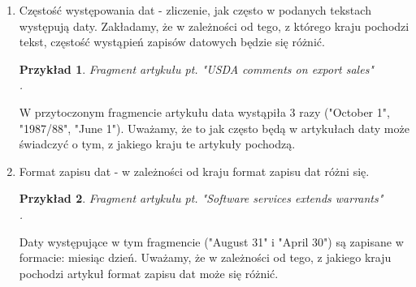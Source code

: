 \documentclass{classrep}
\newtheorem{exmp}{Przykład}[section]
\begin{document}
\begin{enumerate}
    \item Częstość występowania dat - zliczenie, jak często w podanych tekstach występują daty. Zakładamy, że w zależności od tego, z którego kraju pochodzi tekst, częstość wystąpień zapisów datowych będzie się różnić. \\
    \begin{exmp} Fragment artykułu pt. "USDA comments on export sales"  \cite{reuters} \\
		. \\
    \end{exmp}W przytoczonym fragmencie artykułu data wystąpiła 3 razy ("October 1", "1987/88", "June 1"). Uważamy, że to jak często będą w artykułach daty może świadczyć o tym, z jakiego kraju te artykuły pochodzą. \\
    \item Format zapisu dat - w zależności od kraju format zapisu dat różni się. \\
	\begin{exmp} Fragment artykułu pt. "Software services extends warrants" \cite{reuters} \\ 
		.\\
    \end{exmp} Daty występujące w tym fragmencie ("August 31" i "April 30") są zapisane w formacie: miesiąc dzień. Uważamy, że w zależności od tego, z jakiego kraju pochodzi artykuł format zapisu dat może się różnić.
    

\end{enumerate}
\end{document}
